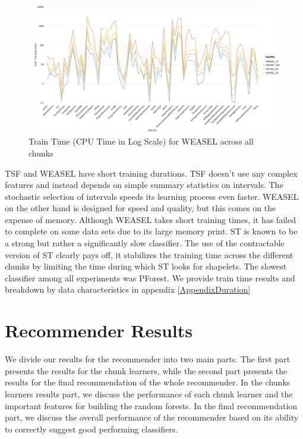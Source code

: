 \begin{figure} [!htb]
  \centering
  \includegraphics[width=\textwidth]{Duration_weasel.jpg}
  \caption{Train Time (CPU Time in Log Scale) for WEASEL across all chunks}
  \label{fig:DurationWeasel}
\end{figure}

TSF and WEASEL have short training durations. TSF doesn't use any complex features and instead depends on simple summary statistics on intervals.
The stochastic selection of intervals speeds its learning process even faster.
WEASEL on the other hand is designed for speed and quality, but this comes on the expense of memory.
Although WEASEL takes short training times, it has failed to complete on some data sets due to its large memory print.
ST is known to be a strong but rather a significantly slow classifier.
The use of the contractable version of ST clearly pays off, it stabilizes the training time across the different chunks by limiting the time during which ST looks for shapelets.
The slowest classifier among all experiments was PForest. We provide train time results and breakdown by data characteristics in appendix \ref{AppendixDuration}

\section{Recommender Results}
\label{SectionRecommenderResults}
We divide our results for the recommender into two main parts. The first part presents the results for the chunk learners, while the second part presents the results for the final recommendation of the whole recommender.
In the chunks learners results part, we discuss the performance of each chunk learner and the important features for building the random forests.
In the final recommendation part, we discuss the overall performance of the recommender based on its ability to correctly suggest good performing classifiers.

